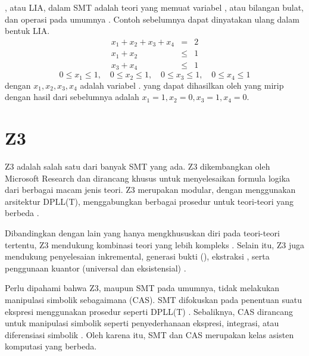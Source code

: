 , atau LIA, dalam SMT adalah teori yang memuat variabel , atau bilangan bulat, dan operasi  pada umumnya \citep{yurichev}. Contoh  sebelumnya dapat dinyatakan ulang dalam bentuk LIA.
\[
\begin{array}{rcl}
	x_1 + x_2 + x_3 + x_4 &=& 2 \\
	x_1 + x_2 &\leq& 1 \\
	x_3 + x_4 &\leq& 1
\end{array}
\]
\[ 0 \leq x_1 \leq 1, \quad 0 \leq x_2 \leq 1, \quad 0 \leq x_3 \leq 1, \quad 0 \leq x_4 \leq 1 \]
dengan \(x_1, x_2, x_3, x_4\) adalah variabel .  yang dapat dihasilkan oleh  yang mirip dengan hasil dari  sebelumnya adalah \(x_1 = 1, x_2 = 0, x_3 = 1, x_4 = 0\).

\section{Z3}

Z3 adalah salah satu dari banyak  SMT yang ada. Z3 dikembangkan oleh Microsoft Research dan dirancang khusus untuk menyelesaikan formula logika dari berbagai macam jenis teori. Z3 merupakan  modular, dengan menggunakan arsitektur DPLL(T), menggabungkan berbagai prosedur untuk teori-teori yang berbeda \citep{demoura2008}.

Dibandingkan dengan  lain yang hanya mengkhususkan diri pada teori-teori tertentu, Z3 mendukung kombinasi teori yang lebih kompleks . Selain itu, Z3 juga mendukung penyelesaian inkremental, generasi bukti (), ekstraksi , serta penggunaan kuantor (universal dan eksistensial) \citep{bjorner}.

Perlu dipahami bahwa Z3, maupun SMT  pada umumnya, tidak melakukan manipulasi simbolik sebagaimana  (CAS). SMT  difokuskan pada penentuan  suatu ekspresi menggunakan prosedur seperti DPLL(T) \citep{demoura2008, bjorner}. Sebaliknya, CAS dirancang untuk manipulasi simbolik seperti penyederhanaan ekspresi, integrasi, atau diferensiasi simbolik \citep{geddes1992}. Oleh karena itu, SMT  dan CAS merupakan kelas asisten komputasi yang berbeda.
